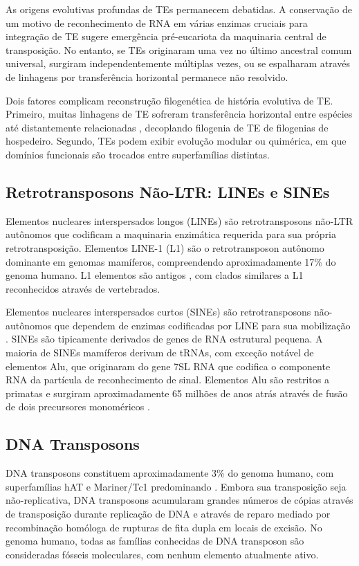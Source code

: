 As origens evolutivas profundas de TEs permanecem debatidas. A conservação de um motivo de reconhecimento de RNA em várias enzimas cruciais para integração de TE sugere emergência pré-eucariota da maquinaria central de transposição. No entanto, se TEs originaram uma vez no último ancestral comum universal, surgiram independentemente múltiplas vezes, ou se espalharam através de linhagens por transferência horizontal permanece não resolvido.

Dois fatores complicam reconstrução filogenética de história evolutiva de TE. Primeiro, muitas linhagens de TE sofreram transferência horizontal entre espécies até distantemente relacionadas \parencite{schaack2010}, decoplando filogenia de TE de filogenias de hospedeiro. Segundo, TEs podem exibir evolução modular ou quimérica, em que domínios funcionais são trocados entre superfamílias distintas.

\subsection{Retrotransposons Não-LTR: LINEs e SINEs}

Elementos nucleares interspersados longos (LINEs) são retrotransposons não-LTR autônomos que codificam a maquinaria enzimática requerida para sua própria retrotransposição. Elementos LINE-1 (L1) são o retrotransposon autônomo dominante em genomas mamíferos, compreendendo aproximadamente 17\% do genoma humano. L1 elementos são antigos \parencite{malik2001}, com clados similares a L1 reconhecidos através de vertebrados.

Elementos nucleares interspersados curtos (SINEs) são retrotransposons não-autônomos que dependem de enzimas codificadas por LINE para sua mobilização \parencite{dewannieux2003}. SINEs são tipicamente derivados de genes de RNA estrutural pequena. A maioria de SINEs mamíferos derivam de tRNAs, com exceção notável de elementos Alu, que originaram do gene 7SL RNA que codifica o componente RNA da partícula de reconhecimento de sinal. Elementos Alu são restritos a primatas e surgiram aproximadamente 65 milhões de anos atrás através de fusão de dois precursores monoméricos \parencite{batzer2002}.

\subsection{DNA Transposons}

DNA transposons constituem aproximadamente 3\% do genoma humano, com superfamílias hAT e Mariner/Tc1 predominando \parencite{cordaux2009}. Embora sua transposição seja não-replicativa, DNA transposons acumularam grandes números de cópias através de transposição durante replicação de DNA e através de reparo mediado por recombinação homóloga de rupturas de fita dupla em locais de excisão. No genoma humano, todas as famílias conhecidas de DNA transposon são consideradas fósseis moleculares, com nenhum elemento atualmente ativo.

